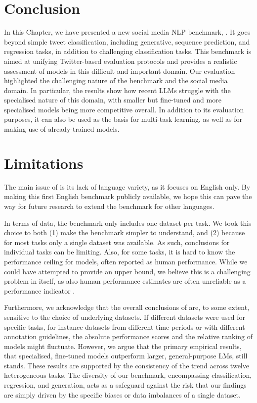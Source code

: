 \section{Conclusion}
In this Chapter, we have presented a new social media \ac{NLP} benchmark, {\DATASET}. It goes beyond simple tweet classification,  including generative, sequence prediction, and regression tasks, in addition to challenging classification tasks. This benchmark is aimed at unifying Twitter-based evaluation protocols and provides a realistic assessment of models in this difficult and important domain. Our evaluation highlighted the challenging nature of the benchmark and the social media domain. In particular, the results show how recent \acp{LLM} struggle with the specialised nature of this domain, with smaller but fine-tuned and more specialised models being more competitive overall. In addition to its evaluation purposes, it can also be used as the basis for multi-task learning, as well as for making use of already-trained models. 



\section*{Limitations}
The main issue of {\DATASET} is its lack of language variety, as it focuses on English only. By making this first English benchmark publicly available, we hope this can pave the way for future research to extend the benchmark for other languages. 

In terms of data, the benchmark only includes one dataset per task. We took this choice to both (1) make the benchmark simpler to understand, and (2) because for most tasks only a single dataset was available. As such, conclusions for individual tasks can be limiting. Also, for some tasks, it is hard to know the performance ceiling for models, often reported as human performance. While we could have attempted to provide an upper bound, we believe this is a challenging problem in itself, as also human performance estimates are often unreliable as a performance indicator \cite{tedeschi2023s}.

Furthermore, we acknowledge that the overall conclusions of {\DATASET} are, to some extent, sensitive to the choice of underlying datasets. If different datasets were used for specific tasks, for instance datasets from different time periods or with different annotation guidelines, the absolute performance scores and the relative ranking of models might fluctuate. However, we argue that the primary empirical results, that specialised, fine-tuned models outperform larger, general-purpose \acp{LM}, still stands. These results are supported by the consistency of the trend across twelve heterogeneous tasks. The diversity of our benchmark, encompassing classification, regression, and generation, acts as a safeguard against the risk that our findings are simply driven by the specific biases or data imbalances of a single dataset.

